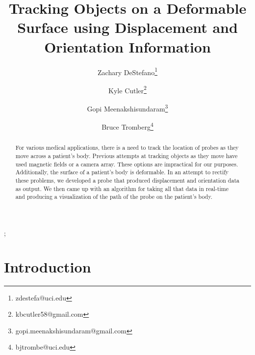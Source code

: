 \documentclass[conference]{acmsiggraph}
\title{Tracking Objects on a Deformable Surface using Displacement and Orientation Information}
\author[1]{Zachary DeStefano\thanks{zdestefa@uci.edu}}
\author[1]{Kyle Cutler\thanks{kbcutler58@gmail.com}}
\author[1]{Gopi Meenakshisundaram\thanks{gopi.meenakshisundaram@gmail.com}}
\author[1]{Bruce Tromberg\thanks{bjtrombe@uci.edu}}
\affil[1]{University of California, Irvine}
\begin{document}

\maketitle

\begin{abstract}

For various medical applications, there is a need to track the location of probes as they move across a patient's body. Previous attempts at tracking objects as they move have used magnetic fields or a camera array. These options are impractical for our purposes. Additionally, the surface of a patient's body is deformable. In an attempt to rectify these problems, we developed a probe that produced displacement and orientation data as output. We then came up with an algorithm for taking all that data in real-time and producing a visualization of the path of the probe on the patient's body. 

\end{abstract}

\begin{CRcatlist}
  ;
\end{CRcatlist}

\keywordlist


\TOGlinkslist


\copyrightspace

\section{Introduction}
\end{document}
